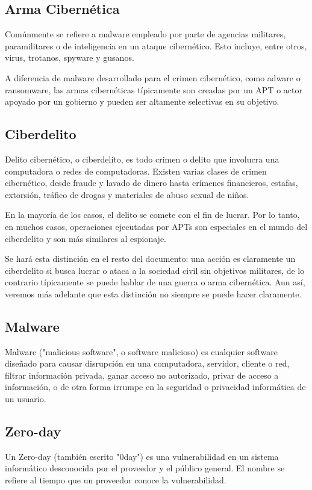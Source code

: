 \documentclass{article}
\begin{document}
\subsection{Arma Cibernética}
Comúnmente se refiere a malware empleado por parte de agencias militares, paramilitares o de inteligencia en un ataque cibernético. Esto incluye, entre otros, virus, trotanos, spyware y gusanos.

A diferencia de malware desarrollado para el crimen cibernético, como adware o ransomware, las armas cibernéticas típicamente son creadas por un APT o actor apoyado por un gobierno y pueden ser altamente selectivas en su objetivo. \autocite{stevens-cyberweapons}

\subsection{Ciberdelito}
Delito cibernético, o ciberdelito, es todo crimen o delito que involucra una computadora o redes de computadoras. Existen varias clases de crimen cibernético, desde fraude y lavado de dinero hasta crímenes financieros, estafas, extorsión, tráfico de drogas y materiales de abuso sexual de niños.

En la mayoría de los casos, el delito se comete con el fin de lucrar. Por lo tanto, en muchos casos, operaciones ejecutadas por APTs son especiales en el mundo del ciberdelito y son más similares al espionaje.

Se hará esta distinción en el resto del documento: una acción es claramente un ciberdelito si busca lucrar o ataca a la sociedad civil sin objetivos militares, de lo contrario típicamente se puede hablar de una guerra o arma cibernética. Aun así, veremos más adelante que esta distinción no siempre se puede hacer claramente. \autocite{cybercrime-britannica}

\subsection{Malware}
Malware ("malicious software", o software malicioso) es cualquier software diseñado para causar disrupción en una computadora, servidor, cliente o red, filtrar información privada, ganar acceso no autorizado, privar de acceso a información, o de otra forma irrumpe en la seguridad o privacidad informática de un usuario. \autocite{tahir-malware}

\subsection{Zero-day}
Un Zero-day (también escrito "0day") es una vulnerabilidad en un sistema informático desconocida por el proveedor y el público general. El nombre se refiere al tiempo que un proveedor conoce la vulnerabilidad.
\end{document}
